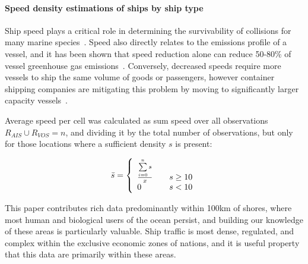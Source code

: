 \paragraph{Speed density estimations of ships by ship type}
\label{sec:ship-density-estimates}
Ship speed plays a critical role in determining the survivability of collisions for many marine species~\citep{Vanderlaan2009}. Speed also directly relates to the emissions profile of a vessel, and it has been shown that speed reduction alone can reduce 50-80\% of vessel greenhouse gas emissions~\citep{lack2011impact}. Conversely, decreased speeds require more vessels to ship the same volume of goods or passengers, however container shipping companies are mitigating this problem by moving to significantly larger capacity vessels~\citep{notteboom2004container}. 

Average speed per cell was calculated as sum speed over all observations $R_{AIS} \cup R_{VOS} = n$, and dividing it by the total number of observations, but only for those locations where a sufficient density $s$ is present: 

\begin{equation}
 \bar{s} = \left\{
   \begin{array}{l l}
    \frac{\sum\limits_{i=0}^n s}{x} & \quad \text{$s \ge 10$}\\
    0 & \quad \text {$s < 10$}
   \end{array}\right.
\end{equation}

 This paper contributes rich data predominantly within 100km of shores, where most human and biological users of the ocean persist, and building our knowledge of these areas is particularly valuable. Ship traffic is most dense, regulated, and complex within the exclusive economic zones of nations, and it is useful property that this data are primarily within these areas.



